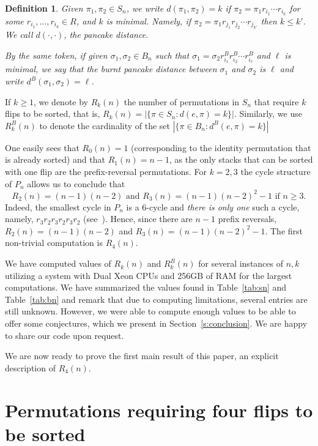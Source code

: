 \documentclass[final]{dmtcs-episciences}
\numberwithin{equation}{section}
\newtheorem{defn}[thm]{Definition}
\begin{document}
\begin{defn}
Given $\pi_1,\pi_2\in S_n$, we write $d(\pi_1,\pi_2)=k$ if $\pi_2=\pi_1 r_{i_1}\cdots r_{i_k}$ for some $r_{i_1},\ldots,r_{i_k}\in R$, and $k$ is minimal. Namely, if $\pi_2=\pi_1 r_{j_1}r_{j_2}\cdots r_{j_{k'}}$ then $k\leq k'$. We call $d(\cdot,\cdot)$, the pancake distance. 

By the same token, if given $\sigma_1,\sigma_2\in B_n$ such that $\sigma_1=\sigma_2r^B_{i_1}r^B_{i_2}\cdots r^B_{i_{\ell}}$ and $\ell$ is minimal, we say that the \textit{burnt pancake distance} between $\sigma_1$ and $\sigma_2$ is $\ell$ and write $d^B(\sigma_1,\sigma_2)=\ell$.
\end{defn}



If $k\geq1$, we denote by $R_k(n)$ the number of permutations in $S_n$ that require $k$ flips to be sorted, that is, $R_k(n)=|\{\pi\in S_n: d(e,\pi)=k\}|$. Similarly, we use $R_k^B(n)$ to denote the cardinality of the set $|\{\pi\in B_n: d^B(e,\pi)=k\}|$


One easily sees that $R_0(n)=1$ (corresponding to the identity permutation that is already sorted) and that $R_1(n)=n-1$, as the only stacks that can be sorted with one flip are the prefix-reversal permutations. For $k=2,3$ the cycle structure of $P_n$ allows us to conclude that 
\[
R_2(n)=(n-1)(n-2)\text{ and }R_3(n)=(n-1)(n-2)^2-1\text { if }n\geq3.
\] 
Indeed, the smallest cycle in $P_n$ is a 6-cycle and \textit{there is only one} such a cycle, namely, $r_3 r_2 r_3 r_2 r_3 r_2$ (see~\cite[Theorem 1.1-1.2]{KonMed}). Hence, since there are $n-1$ prefix reversals, $R_2(n)=(n-1)(n-2)$ and $R_3(n)=(n-1)(n-2)^2-1$. The first non-trivial computation is $R_4(n)$. 

We have computed values of $R_k(n)$ and $R^B_k(n)$ for several instances of $n,k$ utilizing a system with Dual Xeon CPUs and 256GB of RAM for the largest computations. We have summarized the values found in Table~\ref{tab:sn} and Table~\ref{tab:bn} and remark that due to computing limitations, several entries are still unknown. However, we were able to compute enough values to be able to offer some conjectures, which we present in Section~\ref{s:conclusion}. We are happy to share our code upon request. 

We are now ready to prove the first main result of this paper, an explicit description of $R_4(n)$. 

\section{Permutations requiring four flips to be sorted}\label{sec:sn}
\end{document}
